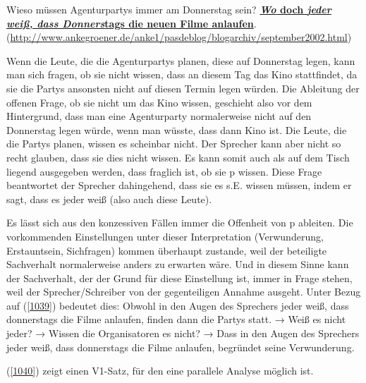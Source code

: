 \begin{exe}
	\ex\label{1039} 

	Wieso müssen Agenturpartys immer am Donnerstag sein? \ul{\textbf{\textit{Wo} doch \textit{jeder weiß, dass Donners}tags die neuen Filme anlaufen}}.                                     
	\newline              		
	\hbox{}\hfill\hbox{\scriptsize(\url{http://www.ankegroener.de/anke1/pasdeblog/blogarchiv/september2002.html})}
\end{exe}
Wenn die Leute, die die Agenturpartys planen, diese auf Donnerstag legen, kann man sich fragen, ob sie nicht wissen, dass an diesem Tag das Kino stattfindet, da sie die Partys ansonsten nicht auf diesen Termin legen würden. Die Ableitung der offenen Frage, ob sie nicht um das Kino wissen, geschieht also vor dem Hintergrund, dass man eine Agenturparty normalerweise nicht auf den Donnerstag legen würde, wenn man wüsste, dass dann Kino ist.  Die Leute, die die Partys planen, wissen es scheinbar nicht. Der Sprecher kann aber nicht so recht glauben, dass sie dies nicht wissen. Es kann somit auch als auf dem Tisch liegend ausgegeben werden, dass fraglich ist, ob sie p wissen. Diese Frage beantwortet der Sprecher dahingehend, dass sie es s.E. wissen müssen, indem er sagt, dass es jeder weiß (also auch diese Leute).

Es lässt sich aus den konzessiven Fällen immer die Offenheit von p ableiten. Die vorkommenden Einstellungen unter dieser Interpretation (Verwunderung, Erstauntsein, Sichfragen) kommen überhaupt zustande, weil der beteiligte Sachverhalt normalerweise anders zu erwarten wäre. Und in diesem Sinne kann der Sachverhalt, der der Grund für diese Einstellung ist, immer in Frage stehen, weil der Sprecher/Schreiber von der gegenteiligen Annahme ausgeht. Unter Bezug auf (\ref{1039}) bedeutet dies: Obwohl in den Augen des Sprechers jeder weiß, dass donnerstags die Filme anlaufen, finden dann die Partys statt. → Weiß es nicht jeder? → Wissen die Organisatoren es nicht? → Dass in den Augen des Sprechers jeder weiß, dass donnerstags die Filme anlaufen, begründet seine Verwunderung.

(\ref{1040}) zeigt einen V1-Satz, für den eine parallele Analyse möglich ist.


